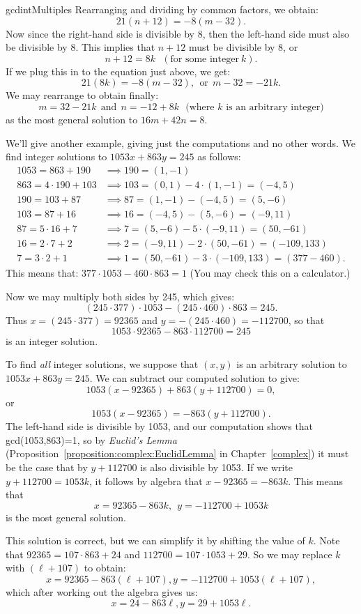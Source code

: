 \begin{example}{gcdintMultiples}
Rearranging and dividing by common factors, we obtain:
\[ 21(n+12) = -8(m-32).\]
Now since the right-hand side is divisible by 8, then the left-hand side must also be divisible by 8.  This implies that $n+12$ must be divisible by 8, or 
\[ n+12 = 8k~~~(\text{for some integer}~k). \]
If we plug this in to the equation just above, we get:
\[ 21(8k) = -8(m-32),~~\text{or}~~m-32 = -21k .\]
We may rearrange to obtain finally:
\[ m = 32 - 21k ~~\text{and}~~ n = -12 + 8k~~~(\text{where }k \text{  is an arbitrary integer)} \]
as the most general solution to  $16m + 42n = 8$.
\end {example}

\begin{example}{}
We'll give another example, giving just the computations and no other words. We find integer solutions to $1053x + 863y =245$ as follows:
\begin{align*}
1053 = 863 + 190 &\implies 190 = (1,-1)\\
863 = 4 \cdot 190 +103 & \implies 103 = (0,1) - 4\cdot (1,-1) = (-4,5)\\
190 = 103 + 87 &\implies 87 = (1,-1) - (-4,5) = (5,-6)\\
103 = 87  + 16 &\implies 16 = (-4,5) - (5,-6) = (-9,11)\\
87 = 5 \cdot 16 + 7 &\implies 7 = (5,-6) - 5\cdot (-9,11) = (50,-61)\\
16 = 2 \cdot 7 + 2 &\implies 2 = (-9,11) - 2 \cdot(50,-61) = (-109,133)\\
7 = 3 \cdot 2 + 1 &\implies 1 = (50,-61) - 3 \cdot(-109,133) = (377 -460).
\end{align*}
This means that:  $377 \cdot 1053  - 460 \cdot 863 = 1$  (You may check this on a calculator.)  

\noindent
Now we may multiply both sides by 245, which gives:  
$$(245 \cdot 377)\cdot 1053 - (245 \cdot 460)\cdot 863 = 245.$$
Thus $x=(245 \cdot 377) =92365$ and $y=- (245 \cdot 460) =-112700$, so that
$$1053 \cdot 92365  - 863 \cdot 112700 = 245$$ 
is an integer solution.

To find \emph{all} integer solutions, we suppose that $(x,y)$ is an arbitrary solution to  $1053x + 863y = 245$. We can  subtract our computed solution to give:
$$1053(x-92365) + 863(y+112700) = 0,$$
or
$$1053(x-92365) = -863(y+112700).$$
The left-hand side is divisible by 1053, and our computation shows that gcd(1053,863)=1, so by \emph{Euclid's Lemma} (Proposition~\ref{proposition:complex:EuclidLemma} in Chapter~\ref{complex}) it must be the case that by $y + 112700$ is also divisible by 1053.  If we write $y + 112700 = 1053k$, it follows by algebra that $x - 92365 = -863k$. This means that 
$$ x = 92365 - 863k,~~ y = -112700 + 1053k$$
is the most general solution.  

This solution is correct, but we can simplify it by shifting the value of $k$.  Note that $92365 = 107 \cdot 863 + 24$ and $112700 = 107 \cdot 1053 + 29$.  So we may replace $k$ with $(\ell + 107)$ to obtain:
$$ x = 92365 - 863(\ell + 107), y = -112700 + 1053(\ell + 107),$$
which after working out the algebra gives us:
$$ x = 24 - 863 \ell, y = 29 + 1053 \ell.$$
\end{example}
 
